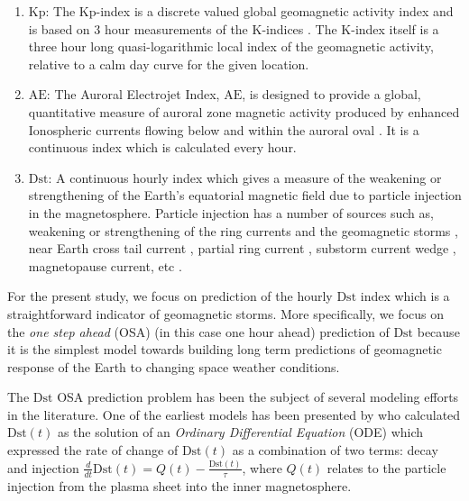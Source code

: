 \begin{enumerate}
    \item $\mathrm{Kp}$: The Kp-index is a discrete valued global geomagnetic activity index and is based on 3 hour measurements of the K-indices \citep{Bartels}. The K-index itself is a three hour long quasi-logarithmic local index of the geomagnetic activity, relative to a calm day curve for the given location.
    
    \item $\mathrm{AE}$: The Auroral Electrojet Index, $\mathrm{AE}$, is designed to provide a global, quantitative measure of auroral zone magnetic activity produced by enhanced Ionospheric currents flowing below and within the auroral oval \citep{AEIndex}. It is a continuous index which is calculated every hour.
    
    \item $\mathrm{Dst}$: A continuous hourly index which gives a measure of the weakening or strengthening of the Earth's equatorial magnetic field due to particle injection in the magnetosphere. Particle injection has a number of sources such as, weakening or strengthening of the ring currents and the geomagnetic storms \citep{DesslerAndParker}, near Earth cross tail current \citep{ganushkina2004long,angeo-28-123-2010}, partial ring current \citep{JGRA:JGRA15878}, substorm current wedge \citep{JGRA:JGRA15211}, magnetopause current, etc . 
\end{enumerate}

For the present study, we focus on prediction of the hourly $\mathrm{Dst}$ index which is a straightforward indicator of geomagnetic storms. More specifically, we focus on the \emph{one step ahead} (OSA) (in this case one hour ahead) prediction of $\mathrm{Dst}$ because it is the simplest model towards building long term predictions of geomagnetic response of the Earth to changing space weather conditions. 

The $\mathrm{Dst}$ OSA prediction problem has been the subject of several modeling efforts in the literature. One of the earliest models has been presented by \citet{JGR:JGR10260} who calculated $\mathrm{Dst}(t)$ as the solution of an \emph{Ordinary Differential Equation} (ODE) which expressed the rate of change of $\mathrm{Dst}(t)$ as a combination of two terms: decay and injection $\frac{d}{dt} \mathrm{Dst}(t) = Q(t) - \frac{\mathrm{Dst}(t)}{\tau}$, where $Q(t)$ relates 
to the particle injection from the plasma sheet into the inner magnetosphere. 

